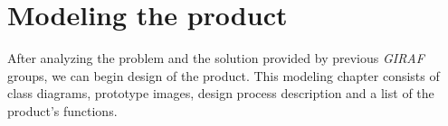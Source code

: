 \chapter{Modeling the product}
After analyzing the problem and the solution provided by previous \emph{GIRAF} groups, we can begin design of the product.
This modeling chapter consists of class diagrams, prototype images, design process description and a list of the product's functions.
